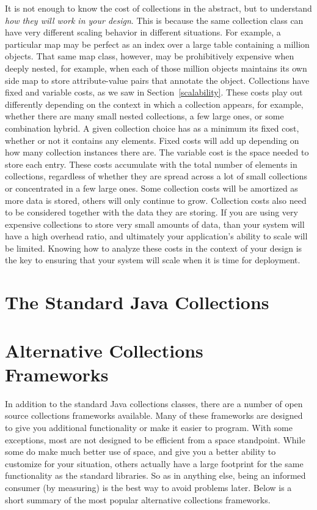 It is not enough to know the cost
of collections in the abstract, but to understand \emph{how they will work in
your design}. This is because the same collection class can have very different
scaling behavior in different situations. For example, a particular map
may be perfect as an index over a large table containing a
million objects. That same map class, however, may be prohibitively expensive
when deeply nested, for example, when each of those
million objects maintains its own side map to store attribute-value pairs that
annotate the object.
Collections have fixed and variable costs, as we saw
in Section~\ref{scalability}. These costs play out differently
depending on the context in which a collection appears, for example, whether
there are many small nested collections, a few large ones, or some combination
hybrid.  A given collection choice has as a minimum its fixed cost,
whether or not it contains any elements. Fixed costs will add up depending on
how many collection instances there are. The variable cost is the space needed to store each entry. These
 costs accumulate with the total number of
elements in collections, regardless of whether they are spread across a lot of
small collections or concentrated in a few large ones. 
Some collection costs will be amortized as more data is stored, others will only
continue to grow. Collection costs also need to be considered together with the data they are
storing. If you are using very expensive collections to store very small amounts
of data, than your system will have a high overhead ratio, and ultimately your application's ability
to scale will be limited. 
Knowing how to analyze these costs in the context of your design
is the key to ensuring that your system will scale when it is time for
deployment.  

\section{The Standard Java Collections}


\section{Alternative Collections Frameworks}
In addition to the standard Java collections classes, there are a number of
open source collections frameworks available. Many of these frameworks
are designed to give you additional functionality or make it easier to
program. With some exceptions, most are not designed to be efficient from a
space standpoint. While some do make much better use of space, and give you a
better ability to customize for your situation, others actually have a
large footprint for the same functionality as the standard libraries. So as in
anything else, being an informed consumer (by measuring) is the best way to
avoid problems later. Below is a short summary of the most
popular alternative collections frameworks.


